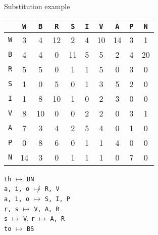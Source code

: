 \documentclass[8pt]{beamer}
\theoremstyle{plain}
\begin{document}
\begin{frame}[fragile]{Substitution example}
\begin{center}
\begin{tabular}{c | c c c c c c c c c}
    &\texttt{W} & \texttt{B} & \texttt{R} & \texttt{S} & \texttt{I} & \texttt{V} & \texttt{A} & \texttt{P} & \texttt{N}\\
    \hline
    \texttt{W} & 3 & 4 & 12 & 2 & 4 & 10 & 14 & 3 & 1\\
    \texttt{B} & 4 & 4 & 0 & 11 & 5 & 5 & 2 & 4 & 20\\
    \texttt{R} & 5 & 5 & 0 & 1 & 1 & 5 & 0 & 3 & 0\\
    \texttt{S} & 1 & 0 & 5 & 0 & 1 & 3 & 5 & 2 & 0\\
    \texttt{I} & 1 & 8 & 10 & 1 & 0 & 2 & 3 & 0 & 0\\
    \texttt{V} & 8 & 10 & 0 & 0 & 2 & 2 & 0 & 3 & 1\\
    \texttt{A} & 7 & 3 & 4 & 2 & 5 & 4 & 0 & 1 & 0\\
    \texttt{P} & 0 & 8 & 6 & 0 & 1 & 1 & 4 & 0 & 0\\
    \texttt{N} & 14 & 3 & 0 & 1 & 1 & 1 & 0 & 7 & 0\\
\end{tabular}
\end{center}
\begin{center}
\texttt{th} $\mapsto$ \texttt{BN}\\
\pause
\texttt{a, i, o} $\not\mapsto$ \texttt{R, V}\\
\pause
\texttt{a, i, o} $\mapsto$ \texttt{S, I, P}\\
\pause
\texttt{r, s} $\mapsto$ \texttt{V, A, R}\\
\pause
\texttt{s} $\mapsto$ \texttt{V}, \texttt{r} $\mapsto$ \texttt{A, R}\\
\pause
\texttt{to} $\mapsto$ \texttt{BS}
\end{center}
\end{frame}
\end{document}
